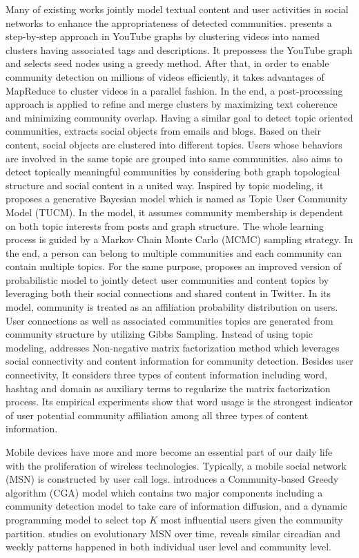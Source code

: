 Many of existing works jointly model textual content and user activities in social networks to enhance the appropriateness of detected communities. \cite{gargi2011large} presents a step-by-step approach in YouTube graphs by clustering videos into named clusters having associated tags and descriptions. It prepossess the YouTube graph and selects seed nodes using a greedy  method. After that, in order to enable community detection on millions of videos efficiently, it takes advantages of MapReduce to cluster videos in a parallel fashion. In the end, a post-processing approach is applied to refine and merge clusters by maximizing text coherence and minimizing community overlap. Having a similar goal to detect topic oriented communities, \cite{zhao2012topic} extracts social objects from emails and blogs. Based on their content, social objects are clustered into different topics. Users whose behaviors are involved in the same topic are grouped into same communities. \cite{sachan2012using} also aims to detect topically meaningful communities by considering both graph topological structure and social content in a united way. Inspired by topic modeling, it proposes a generative Bayesian model which is named as Topic User Community Model (TUCM). In the model, it assumes community membership is dependent on both topic interests from posts and graph structure. The whole learning process is guided by a Markov Chain Monte Carlo (MCMC) sampling strategy. In the end, a person can belong to multiple communities and each community can contain multiple topics. For the same purpose,  \cite{natarajan2013community} proposes an improved version of probabilistic model to jointly detect user communities and content topics by leveraging both their social connections and shared content in Twitter. In its model, community is treated as an affiliation probability distribution on users. User connections as well as associated communities topics are generated from community structure by utilizing Gibbs Sampling. Instead of using topic modeling, \cite{ozer2016community} addresses Non-negative matrix factorization method which leverages social connectivity and content information for community detection. Besides user connectivity, It considers three types of content information including word, hashtag and domain as auxiliary terms to regularize the matrix factorization process. Its empirical experiments show that word usage is the strongest indicator of user potential community affiliation among all three types of content  information.  

Mobile devices have more and more become an essential part of our daily life with the proliferation of wireless technologies. Typically, a mobile social network (MSN) is constructed by user call logs. \cite{wang2010community} introduces a Community-based Greedy algorithm (CGA) model which contains two major components including a community detection model to take care of information diffusion, and a dynamic programming model to select top $K$ most influential users given the community partition. \cite{botta2017analysis} studies on evolutionary MSN over time, reveals similar circadian and weekly patterns happened in both individual user level and community level.


